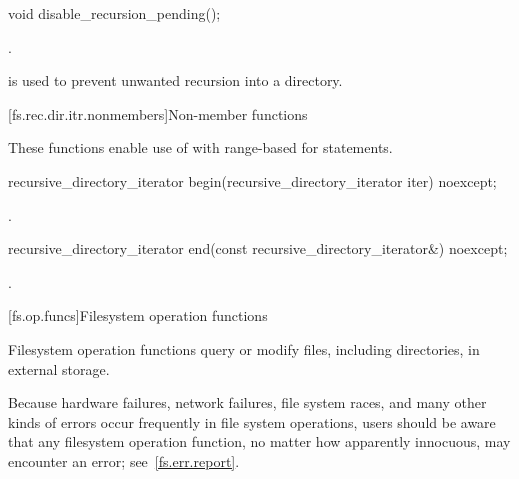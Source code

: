 %
\begin{itemdecl}
void disable_recursion_pending();
\end{itemdecl}

\begin{itemdescr}
\pnum
\ensures {}.

\pnum
\begin{note} \tcode{()} is used to prevent
  unwanted recursion into a directory. \end{note}
\end{itemdescr}

[fs.rec.dir.itr.nonmembers]{Non-member functions}

\pnum
These functions enable use of 
with range-based for statements.

%
\begin{itemdecl}
recursive_directory_iterator begin(recursive_directory_iterator iter) noexcept;
\end{itemdecl}

\begin{itemdescr}
\pnum
\returns {}.
\end{itemdescr}

%
\begin{itemdecl}
recursive_directory_iterator end(const recursive_directory_iterator&) noexcept;
\end{itemdecl}

\begin{itemdescr}
\pnum
\returns {}.
\end{itemdescr}

[fs.op.funcs]{Filesystem operation functions}

\pnum
Filesystem operation functions query or modify files, including directories,
in external storage.

\pnum
\begin{note} Because hardware failures, network failures, file system races,
and many other kinds of errors occur frequently in file system operations, users should be aware
that any filesystem operation function, no matter how apparently innocuous, may encounter
an error; see~\ref{fs.err.report}. \end{note}

